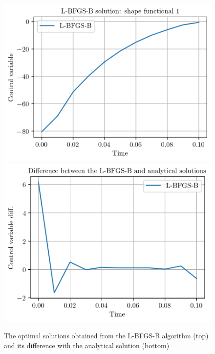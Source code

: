 \begin{figure}
\centering
\includegraphics{Plots/LBFGSBControlVector.png}
\includegraphics{Plots/LBFGSBDiffer.png}
\caption{\label{LBFGSBSolutionComp}The optimal solutions obtained from the L-BFGS-B algorithm (top) and its difference with the analytical solution (bottom)}
\end{figure}

